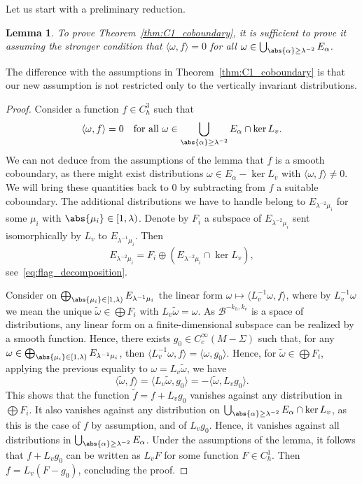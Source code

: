 \documentclass[JEP,XML,SOM,Unicode]{cedram}
\newcommand{\boB}{\mathcal{B}}
\newtheorem{lem}[thm]{Lemma}
\theoremstyle{definition}
\numberwithin{equation}{section}
\begin{document}
Let us start with a preliminary reduction.
\begin{lem}
\label{lem:stronger_assumptions} To prove Theorem~\ref{thm:C1_coboundary}, it
is sufficient to prove it assuming the stronger condition that $\langle
\omega, f \rangle = 0$ for all $\omega \in \bigcup_{\abs{\alpha} \geq
\lambda^{-2}} E_\alpha$.
\end{lem}
The difference with the assumptions in Theorem~\ref{thm:C1_coboundary} is
that our new assumption is not restricted only to the vertically invariant
distributions.
\begin{proof}
Consider a function $f \in C^3_h$ such that
\[
\langle \omega, f \rangle = 0\quad
\text{for all }\omega \in \bigcup_{\abs{\alpha} \geq \lambda^{-2}} E_\alpha \cap
\ker L_v.
\]
We can not deduce from the assumptions of the lemma that $f$ is a
smooth coboundary, as there might exist distributions $\omega \in E_\alpha -
\ker L_v$ with $\langle \omega, f \rangle \neq 0$. We will bring these
quantities back to $0$ by subtracting from $f$ a suitable coboundary. The
additional distributions we have to handle belong to $E_{\lambda^{-2}\mu_i}$
for some $\mu_i$ with $\abs{\mu_i} \in [1, \lambda)$. Denote by $F_i$ a
subspace of $E_{\lambda^{-2}\mu_i}$ sent isomorphically by $L_v$ to
$E_{\lambda^{-1}\mu_i}$. Then
\[
E_{\lambda^{-2}\mu_i} = F_i \oplus
(E_{\lambda^{-2}\mu_i} \cap \ker L_v),
\]
see~\eqref{eq:flag_decomposition}.

Consider on $\bigoplus_{\abs{\mu_i} \in [1, \lambda)} E_{\lambda^{-1}\mu_i}$
the linear form $\omega \mapsto \langle L_v^{-1}\omega, f\rangle$, where by
$L_v^{-1}\omega$ we mean the unique $\tilde \omega \in \bigoplus F_i$ with
$L_v \tilde \omega = \omega$. As $\boB^{-k_h, k_v}$ is a space of
distributions, any linear form on a finite-dimensional subspace can be
realized by a smooth function. Hence, there exists $g_0 \in
C^\infty_c(M-\Sigma)$ such that, for any $\omega \in \bigoplus_{\abs{\mu_i}
\in [1, \lambda)} E_{\lambda^{-1}\mu_i}$, then $\langle L_v^{-1}\omega,
f\rangle = \langle \omega, g_0\rangle$. Hence, for $\tilde \omega \in
\bigoplus F_i$, applying the previous equality to $\omega = L_v\tilde\omega$,
we have
\begin{equation*}
\langle \tilde \omega, f \rangle =
\langle L_v \tilde \omega, g_0 \rangle = -\langle \tilde \omega, L_v g_0 \rangle.
\end{equation*}
This shows that the function $\tilde f = f + L_v g_0$ vanishes against any
distribution in $\bigoplus F_i$. It also vanishes against any distribution on
$\bigcup_{\abs{\alpha}\geq \lambda^{-2}} E_\alpha \cap \ker L_v$, as this is
the case of $f$ by assumption, and of $L_v g_0$. Hence, it vanishes against
all distributions in $\bigcup_{\abs{\alpha} \geq \lambda^{-2}} E_\alpha$.
Under the assumptions of the lemma, it follows that $f+L_v g_0$ can be
written as $L_v F$ for some function $F \in C^1_h$. Then $f= L_v(F-g_0)$,
concluding the proof.
\end{proof}
\end{document}
